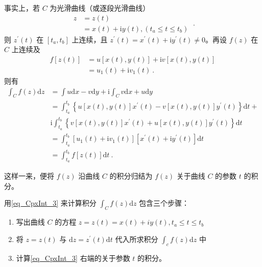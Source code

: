 事实上，若 $C$ 为光滑曲线（或逐段光滑曲线）
\begin{equation}
\begin{aligned} z &=z(t) \\ &=x(t)+\mathrm{i} y(t),(t_a \leqslant t \leqslant t_b) \end{aligned}~.
\end{equation}
则 $z^\prime(t)$ 在 $[t_a, t_b]$ 上连续，且 $z^\prime(t) = x^\prime(t) + \mathrm iy^\prime(t) \neq  0$。再设 $ f (z)$ 在 $C$ 上连续及
\begin{equation}
\begin{aligned} f[z(t)] &=u[x(t), y(t)]+\mathrm{i} v[x(t), y(t)] \\ &=u_{1}(t)+\mathrm{i} v_{1}(t)~. \end{aligned}
\end{equation}
则有
\begin{equation} \label{eq_CpxInt_3}
\begin{aligned} \int_{C} f(z) \mathrm{d} z &=\int u \mathrm{d} x-v \mathrm{d} y+\mathrm{i} \int_{C} v \mathrm{d} x+u \mathrm{d} y \\ &=\int_{t_a}^{t_b}\left\{u[x(t), y(t)] x^{\prime}(t)-v[x(t), y(t)] y^{\prime}(t)\right\} \mathrm{d} t+\\ & \mathrm{i} \int_{t_a}^{t_b}\left\{v[x(t), y(t)] x^{\prime}(t)+u[x(t), y(t)] y^{\prime}(t)\right\} \mathrm{d} t \\ &=\int_{t_a}^{t_b}\left[u_{1}(t)+\mathrm{i} v_{1}(t)\right]\left[x^{\prime}(t)+\mathrm{i} y^{\prime}(t)\right] \mathrm{d} t \\ &=\int_{t_a}^{t_b} f[z(t)] \mathrm{d} t ~.\end{aligned}
\end{equation}

这样一来，便将 $ f (z)$ 沿曲线 $C$ 的积分归结为 $ f (z)$ 关于曲线 $C$ 的参数 $t$ 的积分。

用\autoref{eq_CpxInt_3} 来计算积分 $\displaystyle \int_{C} f(z) \mathrm{d} z$ 包含三个步骤：
\begin{enumerate}
\item 写出曲线 $C$ 的方程 $z=z(t)=x(t)+i y(t), t_a \leqslant t \leqslant t_b$
\item 将 $ z = z(t)$ 与 $\mathrm{d}z = z^\prime (t)\mathrm{d}t $ 代入所求积分 $\displaystyle \int_{c} f(z) \mathrm{d} z$ 中
\item 计算\autoref{eq_CpxInt_3} 右端的关于参数 $t$ 的积分。
\end{enumerate}

